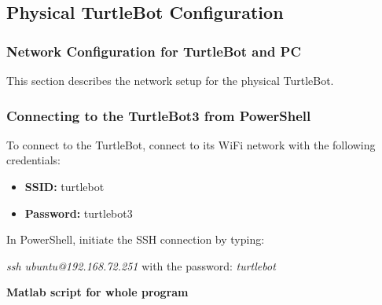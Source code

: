\documentclass[12pt,a4paper]{article}
\begin{document}
	\subsection{Physical TurtleBot Configuration}
	\subsubsection{Network Configuration for TurtleBot and PC}
	This section describes the network setup for the physical TurtleBot.
	\subsubsection{Connecting to the TurtleBot3 from PowerShell}
	To connect to the TurtleBot, connect to its WiFi network with the following credentials:
	\begin{itemize}
		\item \textbf{SSID:} turtlebot
		\item \textbf{Password:} turtlebot3
	\end{itemize}
	In PowerShell, initiate the SSH connection by typing:
	\begin{center}
		\textit{ssh ubuntu@192.168.72.251} with the password: \textit{turtlebot}
	\end{center}
	\noindent\textbf{Matlab script for whole program}
\end{document}
